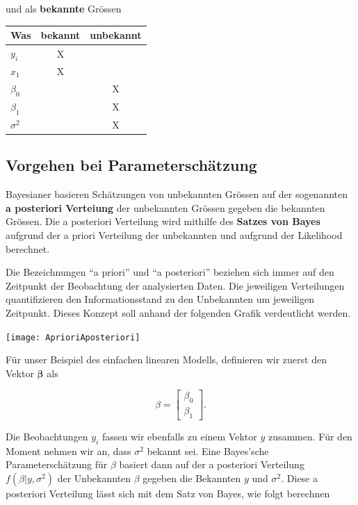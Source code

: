 \documentclass[]{book}
\begin{document}
und als \textbf{bekannte} Grössen

\begin{center}
\begin{tabular}{p{3cm}cc}
\hline
Was         &  bekannt  &  unbekannt \\
\hline
$y_i$       &    X      & \\
$x_1$       &    X      & \\
$\beta_0$   &           &      X \\
$\beta_1$   &           &      X \\
$\sigma^2$  &           &      X \\
\hline
\end{tabular}
\end{center}

\subsection{Vorgehen bei
Parameterschätzung}\label{vorgehen-bei-parameterschatzung}

Bayesianer basieren Schätzungen von unbekannten Grössen auf der
sogenannten \textbf{a posteriori Verteiung} der unbekannten Grössen
gegeben die bekannten Grössen. Die a posteriori Verteilung wird mithilfe
des \textbf{Satzes von Bayes} aufgrund der a priori Verteilung der
unbekannten und aufgrund der Likelihood berechnet.

Die Bezeichnungen ``a priori'' und ``a posteriori'' beziehen sich immer
auf den Zeitpunkt der Beobachtung der analysierten Daten. Die jeweiligen
Verteilungen quantifizieren den Informationsstand zu den Unbekannten um
jeweiligen Zeitpunkt. Dieses Konzept soll anhand der folgenden Grafik
verdeutlicht werden.

\begin{center}\texttt{[image: AprioriAposteriori]} \end{center}

Für unser Beispiel des einfachen linearen Modells, definieren wir zuerst
den Vektor \(\mathbf{\beta}\) als

\[\beta = \left[\begin{array}{c} \beta_0  \\  \beta_1 \end{array} \right].\]

Die Beobachtungen \(y_i\) fassen wir ebenfalls zu einem Vektor \(y\)
zusammen. Für den Moment nehmen wir an, dass \(\sigma^2\) bekannt sei.
Eine Bayes'sche Parameterschätzung für \(\beta\) basiert dann auf der a
posteriori Verteilung \(f(\beta | y, \sigma^2)\) der Unbekannten
\(\beta\) gegeben die Bekannten \(y\) und \(\sigma^2\). Diese a
posteriori Verteilung lässt sich mit dem Satz von Bayes, wie folgt
berechnen
\end{document}
